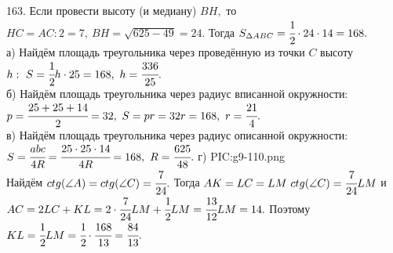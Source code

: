 163. Если провести высоту (и медиану) $BH,$ то $HC=AC:2=7,\ BH=\sqrt{625-49}=24.$ Тогда $S_{\Delta ABC}=\cfrac{1}{2}\cdot24\cdot14=168.$\\
а) Найдём площадь треугольника через проведённую из точки $C$ высоту $h:\ S=\cfrac{1}{2}h\cdot25=168,\ h=\cfrac{336}{25}.$\\
б) Найдём площадь треугольника через радиус вписанной окружности: $p=\cfrac{25+25+14}{2}=32,\ S=pr=32r=168,\ r=\cfrac{21}{4}.$\\
в) Найдём площадь треугольника через радиус описанной окружности: $S=\cfrac{abc}{4R}=\cfrac{25\cdot25\cdot14}{4R}=168,\ R=\cfrac{625}{48}.$\newpage\noindent
г) {{PIC:g9-110.png}}\\
Найдём $ctg(\angle A)=ctg(\angle C)=\cfrac{7}{24}.$ Тогда $AK=LC=LM\ ctg(\angle C)=\cfrac{7}{24}LM$ и $AC=2LC+KL=2\cdot\cfrac{7}{24}LM+\cfrac{1}{2}LM=\cfrac{13}{12}LM=14.$ Поэтому $KL=\cfrac{1}{2}LM=\cfrac{1}{2}\cdot\cfrac{168}{13}=\cfrac{84}{13}.$\\
